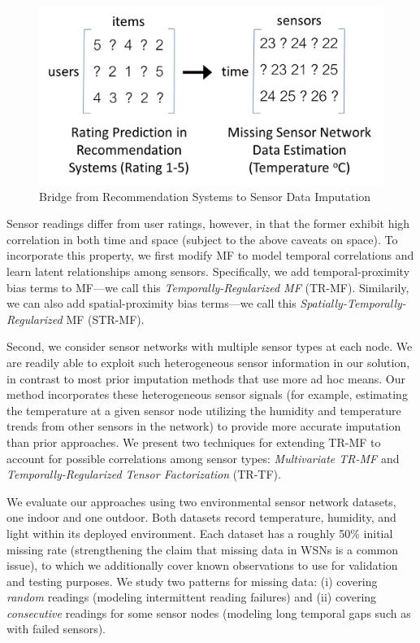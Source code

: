 \begin{figure}[H]
\centering
\includegraphics[scale=0.35]{recommend_imputation_timerow.png}
\caption{Bridge from Recommendation Systems to Sensor Data Imputation} 
\label{recommend_imputation}
\vspace{-0.1in}
\end{figure}

Sensor readings differ from user ratings, however, in that the former
exhibit high correlation in both time and space (subject to the above
caveats on space).  To incorporate this property, we first modify MF
to model temporal correlations and learn latent relationships among
sensors.  Specifically, we add temporal-proximity bias terms to
MF---we call this {\em Temporally-Regularized MF} (TR-MF). 
Similarily, we can also add spatial-proximity bias terms---we 
call this {\em Spatially-Temporally-Regularized} MF (STR-MF).

Second, we consider sensor networks with multiple sensor types at each node.
We are readily able to exploit such heterogeneous sensor information in our
solution, in contrast to most prior imputation methods that use more ad hoc means.
Our method incorporates these heterogeneous sensor
signals (for example, estimating the temperature at a given sensor
node utilizing the humidity and temperature trends from other
sensors in the network) to provide more accurate imputation than 
prior approaches.  We present two techniques for extending 
TR-MF to account for possible correlations among sensor types: {\em Multivariate TR-MF} and 
{\em Temporally-Regularized Tensor Factorization} (TR-TF).

We evaluate our approaches using two environmental sensor network
datasets, one indoor and one outdoor.
Both datasets record temperature, humidity, and light within its deployed
environment.  Each dataset has a roughly 50\% initial missing rate (strengthening
the claim that missing data in WSNs is a common issue), to which we
additionally cover known observations to use for validation and
testing purposes.  We study two patterns for missing data: (i) covering
{\em random} readings (modeling intermittent reading failures) and (ii)
covering {\em consecutive} readings for some sensor nodes
(modeling long temporal gaps such as with failed sensors).

